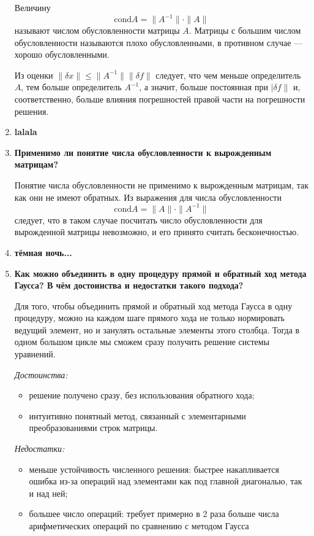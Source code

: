 \documentclass[12pt, a4paper]{article}
\begin{document}
\begin{enumerate}
		Величину
		$$
		\text{cond} A = \|A^{-1}\|\cdot\|A\|
		$$
		называют числом обусловленности матрицы $A$. Матрицы с большим числом обусловленности называются плохо обусловленными, в противном случае --- хорошо обусловленными.
		
		Из оценки $\|\delta x\|\leqslant\|A^{-1}\|\|\delta f\|$ следует, что чем меньше определитель $A$, тем больше определитель $A^{-1}$, а значит, больше постоянная при $|\delta f\|$ и, соответственно, больше влияния погрешностей правой части на погрешности решения.
		
		\item \textbf{lalala}
		
		\item \textbf{Применимо ли понятие числа обусловленности к вырожденным матрицам?}
		
		Понятие числа обусловленности не применимо к вырожденным матрицам, так как они не имеют обратных. Из выражения для числа обусловленности $$\text{cond} A=\|A\|\cdot\|A^{-1}\|$$ следует, что в таком случае посчитать число обусловленности для вырожденной матрицы невозможно, и его принято считать бесконечностью.
		
		\item \textbf{тёмная ночь...}
		
		\item \textbf{Как можно объединить в одну процедуру прямой и обратный ход метода Гаусса? В чём достоинства и недостатки такого подхода?}
		
		Для того, чтобы объединить прямой и обратный ход метода Гаусса в одну процедуру, можно на каждом шаге прямого хода не только нормировать ведущий элемент, но и занулять остальные элементы этого столбца. Тогда в одном большом цикле мы сможем сразу получить решение системы уравнений.
		
		\textit{Достоинства:}
		\begin{itemize}
			\item решение получено сразу, без использования обратного хода;
			\item интуитивно понятный метод, связанный с элементарными преобразованиями строк матрицы.
		\end{itemize}
		
		\textit{Недостатки:}
		\begin{itemize}
			\item меньше устойчивость численного решения: быстрее накапливается ошибка из-за операций над элементами как под главной диагональю, так и над ней;
			\item большее число операций: требует примерно в 2 раза больше числа арифметических операций по сравнению с методом Гаусса
		\end{itemize}
		
	\end{enumerate}
	
\end{document}
